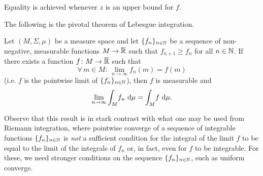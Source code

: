 Equality is achieved whenever $z$ is an upper bound for $f$.

\begin{center}
\end{center}

The following is the pivotal theorem of Lebesgue integration.

\begin{theorem}
Let $(M,\Sigma,\mu)$ be a measure space and let $\{f_n\}_{n\in\mathbb{N}}$ be a sequence of non-negative, measurable functions $M\to\overline{\mathbb{R}}$ such that $f_{n+1}\geq f_n$ for all $n\in \mathbb{N}$. If there exists a function $f\colon M\to \overline{\mathbb{R}}$ such that
\begin{equation*}
\forall \, m \in M : \ \lim_{n\to\infty}f_n(m) = f(m)
\end{equation*}
(i.e. $f$ is the pointwise limit of  $\{f_n\}_{n\in\mathbb{N}}$), then $f$ is measurable and
\begin{equation*}
\lim_{n\to\infty}\int_M\! f_n \, \mathop{}\!\mathrm{d} \mu = \int_M\! f \, \mathop{}\!\mathrm{d} \mu.
\end{equation*}
\end{theorem}

\begin{remark}
Observe that this result is in stark contrast with what one may be used from Riemann integration, where pointwise converge of a sequence of integrable functions $\{f_n\}_{n\in\mathbb{N}}$ is \emph{not} a sufficient condition for the integral of the limit $f$ to be equal to the limit of the integrals of $f_n$ or, in fact, even for $f$ to be integrable. For these, we need stronger conditions on the sequence $\{f_n\}_{n\in\mathbb{N}}$, such as uniform converge.
\end{remark}

